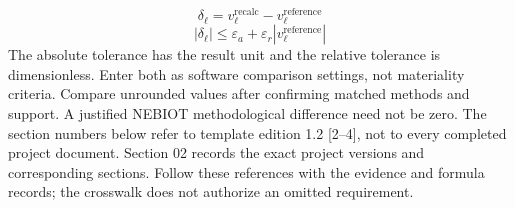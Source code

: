 \[\delta_{\ell}=v_{\ell}^{\mathrm{recalc}}-v_{\ell}^{\mathrm{reference}}\]
\[|\delta_{\ell}|\le\varepsilon_a+\varepsilon_r|v_{\ell}^{\mathrm{reference}}|\]
The absolute tolerance has the result unit and the relative tolerance is dimensionless. Enter both as software comparison settings, not materiality criteria. Compare unrounded values after confirming matched methods and support. A justified NEBIOT methodological difference need not be zero.
The section numbers below refer to template edition 1.2 [2–4], not to every completed project document. Section 02 records the exact project versions and corresponding sections. Follow these references with the evidence and formula records; the crosswalk does not authorize an omitted requirement.
